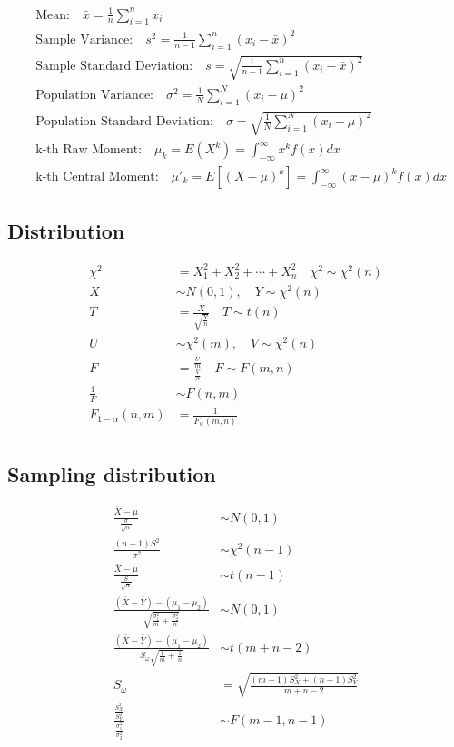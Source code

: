 \documentclass[12pt]{article}
\begin{document}
\begin{align}
    & \text{Mean:} \quad \bar{x} = \frac{1}{n} \sum_{i=1}^{n} x_i \\
    & \text{Sample Variance:} \quad s^2 = \frac{1}{n-1} \sum_{i=1}^{n} (x_i - \bar{x})^2 \\
    & \text{Sample Standard Deviation:} \quad s = \sqrt{\frac{1}{n-1} \sum_{i=1}^{n} (x_i - \bar{x})^2} \\
    & \text{Population Variance:} \quad \sigma^2 = \frac{1}{N} \sum_{i=1}^{N} (x_i - \mu)^2 \\
    & \text{Population Standard Deviation:} \quad \sigma = \sqrt{\frac{1}{N} \sum_{i=1}^{N} (x_i - \mu)^2} \\
    & \text{k-th Raw Moment:} \quad \mu_k = E(X^k) = \int_{-\infty}^{\infty} x^k f(x) dx \\
    & \text{k-th Central Moment:} \quad \mu'_k = E\left[(X-\mu)^k\right] = \int_{-\infty}^{\infty} (x-\mu)^k f(x) dx
\end{align}

\subsection{Distribution}

\begin{align}
    \chi^2 &= X_1^2+X_2^2+\cdots+ X_n^2 \quad \chi^2 \sim \chi^2(n)\\
    X &\sim N(0,1), \quad Y \sim \chi^2(n) \\
    T &= \frac{X}{\sqrt{\frac{Y}{n}}} \quad T \sim t(n) \\
    U &\sim \chi^2(m), \quad V \sim \chi^2(n) \\
    F &= \frac{\frac{U}{m}}{\frac{V}{N}}  \quad F\sim F(m,n) \\
    \frac{1}{F} &\sim F(n,m)\\
    F_{1-\alpha}(n,m) &= \frac{1}{F_\alpha(m,n)} \\
\end{align}

\subsection{Sampling distribution}

\begin{align}
    \frac{\bar{X}-\mu}{\frac{\sigma}{\sqrt{n}}} & \sim N(0,1)\\
    \frac{(n-1)S^2}{\sigma^2} & \sim \chi^2(n-1) \\
    \frac{\bar{X}-\mu}{\frac{S}{\sqrt{n}}} & \sim t(n-1)\\
    \frac{(\bar{X}-\bar{Y})-(\mu_1-\mu_2)}{\sqrt{\frac{\sigma_1^2}{m}+\frac{\sigma_2^2}{n}}} & \sim N(0,1)\\
    \frac{(\bar{X}-\bar{Y})-(\mu_1-\mu_2)}{S_\omega\sqrt{\frac{1}{m}+\frac{1}{n}}} & \sim t(m+n-2)\\
    S_\omega &= \sqrt{\frac{(m-1)S_X^2+(n-1)S_Y^2}{m+n-2}}\\
    \frac{\frac{S_X^2}{S_Y^2}}{\frac{\sigma_1^2}{\sigma_2^2}} & \sim F(m-1,n-1)
\end{align}
\end{document}
